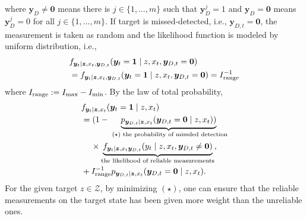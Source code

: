 \documentclass[letterpaper, 10 pt, conference]{ieeeconf}
\newcommand{\rood}[1]{{\color{red}{[#1]}}}
\begin{document}
where $\bm{y}_D \neq \mathbf{0}$ means there is $j \in \lbrace 1,\dots,m \rbrace$ such that $\bm{y}_D^j = 1$ and $\bm{y}_D = \mathbf{0}$ means $\bm{y}_D^j = 0$ for all $j \in \lbrace 1,\dots,m \rbrace$. 
If target is missed-detected, i.e., $\bm{y}_{D,t} =\bm{0}$, the measurement is taken as random and the likelihood function is modeled by uniform distribution, i.e.,
\begin{align*}
&f_{\bm{y}_t \mid \bm{z},x_{t},\bm{y}_{D,t}}(\bm{y}_t = \bm{1} \mid z,x_{t},\bm{y}_{D,t}=\mathbf{0}) \\
&=f_{\bm{y}_t \mid \bm{z},x_{t},\bm{y}_{D,t}}(\bm{y}_t = \bm{1} \mid z,x_{t},\bm{y}_{D,t}=\mathbf{0})= I_{\textup{range}}^{-1}
\end{align*}
where $I_{\textup{range}} := I_{\max} - I_{\min}$. By the law of total probability,
\begin{align*}
&f_{\bm{y}_t \mid \bm{z},x_{t}}(\bm{y}_t = \bm{1} \mid z,x_{t}) \nonumber \\
&=(1-
\underbrace{
p_{\bm{y}_{D,t} \mid \bm{z},x_{t}}(\bm{y}_{D,t} = \mathbf{0} \mid z,x_{t}))}_{\textup{ }(\star) \textup{ the probability of missded detection}} \nonumber \\ 
&\,\,\,\,\,\,\,\times \underbrace{f_{\bm{y}_t \mid \bm{z},x_{t}\bm{y}_{D,t}}(y_t \mid z,x_{t},\bm{y}_{D,t}\neq \mathbf{0})}_{\textup{the likelihood of reliable measurements}}, \nonumber \\
&+I_{\textup{range}}^{-1}p_{\bm{y}_{D,t} \mid \bm{z},x_{t}}(\bm{y}_{D,t} = \mathbf{0} \mid z,x_{t}).
\end{align*}
For the given target $z \in \mathcal{Z}$, by minimizing $(\star)$, one can ensure that the reliable measurements on the target state has been given more weight than the unreliable ones. 

\end{document}
